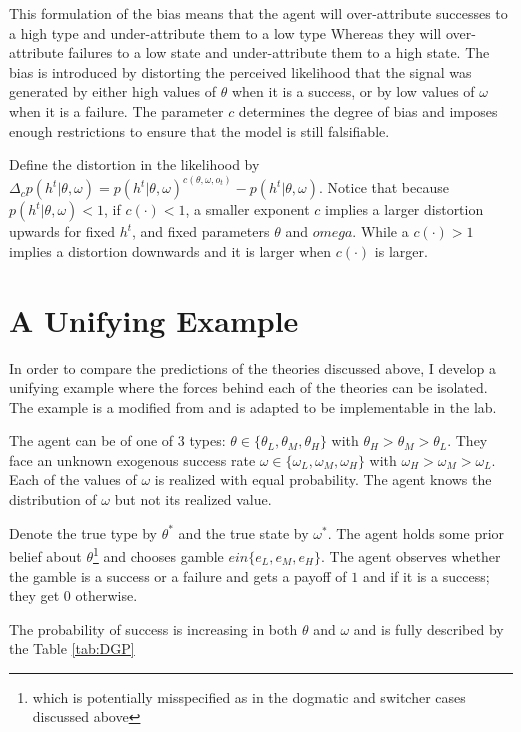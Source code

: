 \documentclass[
  12pt,
]{article}
\begin{document}
This formulation of the bias means that the agent will over-attribute
successes to a high type and under-attribute them to a low type Whereas
they will over-attribute failures to a low state and under-attribute
them to a high state. The bias is introduced by distorting the perceived
likelihood that the signal was generated by either high values of
\(\theta\) when it is a success, or by low values of \(\omega\) when it
is a failure. The parameter \(c\) determines the degree of bias and
imposes enough restrictions to ensure that the model is still
falsifiable.

Define the distortion in the likelihood by
\(\Delta_c p(h^t|\theta, \omega) = p(h^t|\theta, \omega)^{c(\theta, \omega, o_t)} - p(h^t|\theta, \omega)\).
Notice that because \(p(h^t|\theta, \omega)<1\), if \(c(\cdot)<1\), a
smaller exponent \(c\) implies a larger distortion upwards for fixed
\(h^t\), and fixed parameters \(\theta\) and \(omega\). While a
\(c(\cdot)>1\) implies a distortion downwards and it is larger when
\(c(\cdot)\) is larger.

\hypertarget{a-unifying-example}{%
\section{A Unifying Example}\label{a-unifying-example}}

In order to compare the predictions of the theories discussed above, I
develop a unifying example where the forces behind each of the theories
can be isolated. The example is a modified from \citet{Heidhues2018} and
is adapted to be implementable in the lab.

The agent can be of one of 3 types:
\(\theta \in \{\theta_L, \theta_M, \theta_H\}\) with
\(\theta_H > \theta_M > \theta_L\). They face an unknown exogenous
success rate \(\omega \in \{\omega_L, \omega_M, \omega_H\}\) with
\(\omega_H>\omega_M>\omega_L\). Each of the values of \(\omega\) is
realized with equal probability. The agent knows the distribution of
\(\omega\) but not its realized value.

Denote the true type by \(\theta^*\) and the true state by \(\omega^*\).
The agent holds some prior belief about
\(\theta\)\footnote{which is potentially misspecified as in the dogmatic and switcher cases discussed above}
and chooses gamble \(e in \{e_L, e_M, e_H\}\). The agent observes
whether the gamble is a success or a failure and gets a payoff of \(1\)
and if it is a success; they get \(0\) otherwise.

The probability of success is increasing in both \(\theta\) and
\(\omega\) and is fully described by the Table \ref{tab:DGP}
\end{document}
